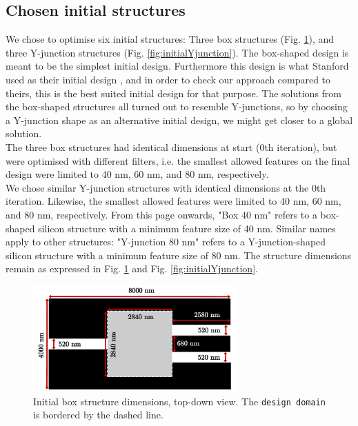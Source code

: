 \subsection{Chosen initial structures}
We chose to optimise six initial structures: Three box structures (Fig. \ref{fig:initialBox}), and three Y-junction structures (Fig. \ref{fig:initialYjunction}). The box-shaped design is meant to be the simplest initial design. Furthermore this design is what Stanford used as their initial design \cite{Stanford}, and in order to check our approach compared to theirs, this is the best suited initial design for that purpose. The solutions from the box-shaped structures all turned out to resemble Y-junctions, so by choosing a Y-junction shape as an alternative initial design, we might get closer to a global solution. \\

The three box structures had identical dimensions at start (0th iteration), but were optimised with different filters, i.e. the smallest allowed features on the final design were limited to 40 nm, 60 nm, and 80 nm, respectively.\\

We chose similar Y-junction structures with identical dimensions at the 0th iteration. Likewise, the smallest allowed features were limited to 40 nm, 60 nm, and 80 nm, respectively. From this page onwards, "Box 40 nm" refers to a box-shaped silicon structure with a minimum feature size of 40 nm. Similar names apply to other structures: "Y-junction 80 nm" refers to a Y-junction-shaped silicon structure with a minimum feature size of 80 nm. The structure dimensions remain as expressed in Fig. \ref{fig:initialBox} and Fig. \ref{fig:initialYjunction}.

\begin{figure}[h!]
    \centering
    \includegraphics[width=0.7\textwidth]
    {fig/design/initialBox.pdf}
    \caption{Initial box structure dimensions, top-down view. The \texttt{design domain} is bordered by the dashed line.}
    \label{fig:initialBox}
\end{figure}

